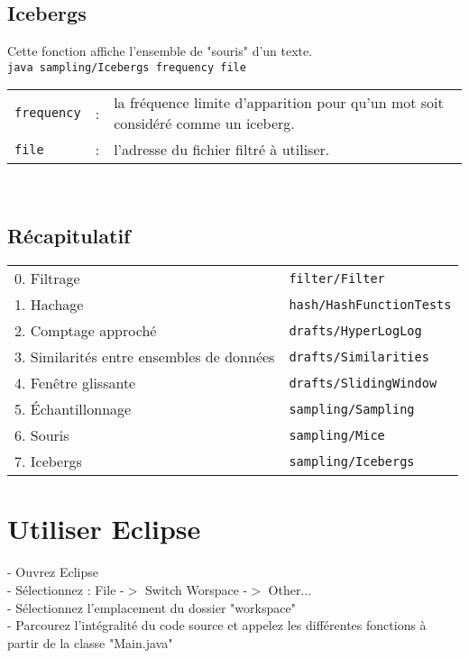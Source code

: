 \documentclass[12pt,a4paper,titlepage]{article}
\newcommand{\code}[1]{ \texttt{\footnotesize #1} }
\begin{document}
\subsection{Icebergs}
Cette fonction affiche l'ensemble de "souris" d'un texte.\\
\code{java  sampling/Icebergs frequency file}\\
\begin{tabular}{lcl}
\code{frequency} &:& la fréquence limite d'apparition pour qu'un mot soit considéré comme un iceberg.\\
\code{file} &:& l'adresse du fichier filtré à utiliser.
\end{tabular}\\


\subsection{Récapitulatif}
\begin{center} \begin{tabular}{ll}
0. Filtrage 		 & \code{filter/Filter} \\
1. Hachage 			 & \code{hash/HashFunctionTests} \\
2. Comptage approché & \code{drafts/HyperLogLog} \\
3. Similarités entre ensembles de données & \code{drafts/Similarities} \\
4. Fenêtre glissante & \code{drafts/SlidingWindow} \\
5. Échantillonnage 	 & \code{sampling/Sampling} \\
6. Souris 			 & \code{sampling/Mice} \\
7. Icebergs 		 & \code{sampling/Icebergs}
\end{tabular} \end{center}





\section{Utiliser Eclipse}
- Ouvrez Eclipse\\
- Sélectionnez : File -$>$ Switch Worspace -$>$ Other...\\
- Sélectionnez l'emplacement du dossier "workspace"\\
- Parcourez l'intégralité du code source et appelez les différentes fonctions à partir de la classe "Main.java"
\end{document}
